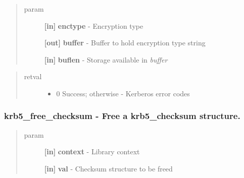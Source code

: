 \documentclass[letterpaper,10pt,english]{sphinxmanual}
\begin{document}
\begin{quote}\begin{description}
\item[{param}] \leavevmode
\textbf{{[}in{]}} \textbf{enctype} - Encryption type

\textbf{{[}out{]}} \textbf{buffer} - Buffer to hold encryption type string

\textbf{{[}in{]}} \textbf{buflen} - Storage available in \emph{buffer}

\end{description}\end{quote}
\begin{quote}\begin{description}
\item[{retval}] \leavevmode\begin{itemize}
\item {} 
0   Success; otherwise - Kerberos error codes

\end{itemize}

\end{description}\end{quote}


\subsubsection{krb5\_free\_checksum -  Free a krb5\_checksum structure.}
\label{appdev/refs/api/krb5_free_checksum:krb5-free-checksum-free-a-krb5-checksum-structure}\label{appdev/refs/api/krb5_free_checksum::doc}

\begin{fulllineitems}
\label{appdev/refs/api/krb5_free_checksum:c.krb5_free_checksum}
\end{fulllineitems}

\begin{quote}\begin{description}
\item[{param}] \leavevmode
\textbf{{[}in{]}} \textbf{context} - Library context

\textbf{{[}in{]}} \textbf{val} - Checksum structure to be freed

\end{description}\end{quote}
\end{document}

